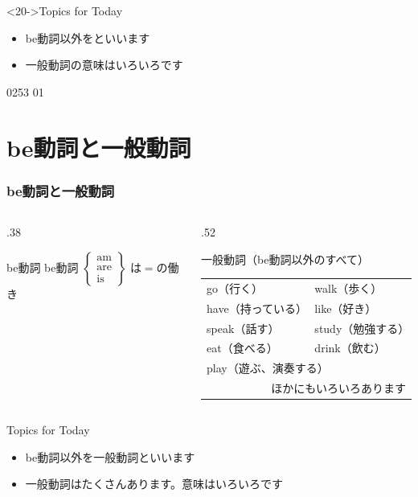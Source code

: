 \documentclass[aspectratio=169,xcolor={dvipsnames,table}]{beamer}
\newcommand{\myaudio}[1]{\href{#1}{\faVolumeUp}}
\begin{document}
\begin{frame}[plain,label=is_verb]
\bigskip

\begin{block}<20->{Topics for Today}
\begin{itemize}[square]
 \item  {be動詞以外をといいます}
 \item<27-> {一般動詞の意味はいろいろです}
\end{itemize}
      \end{block}



\hfill{\tiny 0253}\,{\scriptsize \myaudio{./audio/004_verb_01.mp3}\,01}

\end{frame}
\section{be動詞と一般動詞}
\begin{frame}[plain,label=point1]\frametitle{be動詞と一般動詞}

\begin{columns}
\begin{column}[t]{.38\textwidth}
\begin{exampleblock}{be動詞}
be動詞
{\footnotesize
$
 \left\{
\begin{array}{l}
\text{am}\\
\text{are}\\
\text{is}
\end{array}\right\}
$
}
は$=$の働き
\end{exampleblock}
\end{column}
\pause
\begin{column}[t]{.52\textwidth}
\begin{alertblock}{一般動詞（be動詞以外のすべて）}
\pause
\begin{tabular}[t]{ll}
go（行く）&walk（歩く）\pause\\
have（持っている）&like（好き）\pause\\
speak（話す）&study（勉強する）\pause\\
eat（食べる）& drink（飲む）\pause\\
\multicolumn{2}{l}{play（遊ぶ、演奏する）\pause}\\
\multicolumn{2}{r}{ほかにもいろいろあります}\\
\end{tabular}
\end{alertblock}
\end{column}
\end{columns}


\bigskip
\pause
\begin{block}{Topics for Today}
\begin{itemize}[<+- |alert@+>][square]
 \item  be動詞以外を一般動詞といいます
 \item 一般動詞はたくさんあります。意味はいろいろです
\end{itemize}
     \end{block}

\end{frame}
\end{document}
